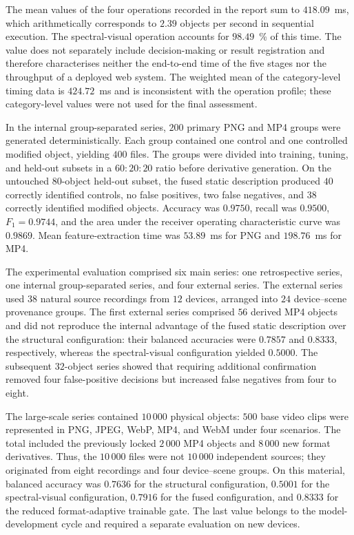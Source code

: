 The mean values of the four operations recorded in the report sum to $418.09$~ms, which arithmetically corresponds to $2.39$ objects per second in sequential execution. The spectral-visual operation accounts for $98.49$~\% of this time. The value does not separately include decision-making or result registration and therefore characterises neither the end-to-end time of the five stages nor the throughput of a deployed web system. The weighted mean of the category-level timing data is $424.72$~ms and is inconsistent with the operation profile; these category-level values were not used for the final assessment.

In the internal group-separated series, $200$ primary PNG and MP4 groups were generated deterministically. Each group contained one control and one controlled modified object, yielding $400$ files. The groups were divided into training, tuning, and held-out subsets in a $60:20:20$ ratio before derivative generation. On the untouched $80$-object held-out subset, the fused static description produced $40$ correctly identified controls, no false positives, two false negatives, and $38$ correctly identified modified objects. Accuracy was $0.9750$, recall was $0.9500$, $F_1=0.9744$, and the area under the receiver operating characteristic curve was $0.9869$. Mean feature-extraction time was $53.89$~ms for PNG and $198.76$~ms for MP4.

The experimental evaluation comprised six main series: one retrospective series, one internal group-separated series, and four external series. The external series used $38$ natural source recordings from $12$ devices, arranged into $24$ device--scene provenance groups. The first external series comprised $56$ derived MP4 objects and did not reproduce the internal advantage of the fused static description over the structural configuration: their balanced accuracies were $0.7857$ and $0.8333$, respectively, whereas the spectral-visual configuration yielded $0.5000$. The subsequent $32$-object series showed that requiring additional confirmation removed four false-positive decisions but increased false negatives from four to eight.

The large-scale series contained $10\,000$ physical objects: $500$ base video clips were represented in PNG, JPEG, WebP, MP4, and WebM under four scenarios. The total included the previously locked $2\,000$ MP4 objects and $8\,000$ new format derivatives. Thus, the $10\,000$ files were not $10\,000$ independent sources; they originated from eight recordings and four device--scene groups. On this material, balanced accuracy was $0.7636$ for the structural configuration, $0.5001$ for the spectral-visual configuration, $0.7916$ for the fused configuration, and $0.8333$ for the reduced format-adaptive trainable gate. The last value belongs to the model-development cycle and required a separate evaluation on new devices.

